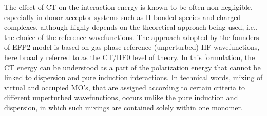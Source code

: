 The effect of CT on the interaction energy 
is known to be often non\hyp{}negligible, especially
in donor\hyp{}acceptor systems such as H\hyp{}bonded species
and charged complexes, although highly depends on the theoretical
approach being used, i.e., the choice of the reference
wavefunctions.
The approach adopted by the founders of EFP2 model
is based on gas\hyp{}phase reference (unperturbed) HF wavefunctions,
here broadly referred to as the CT/HF0 level of theory.
In this formulation, the CT energy can be understood
as a part of the polarization energy that cannot be
linked to dispersion and pure induction interactions. 
In technical words, mixing of virtual and occupied MO's,
that are assigned according to certain criteria 
to different unperturbed wavefunctions, occurs
unlike the pure induction and dispersion, in which such mixings are contained
solely within one monomer.
%
%

